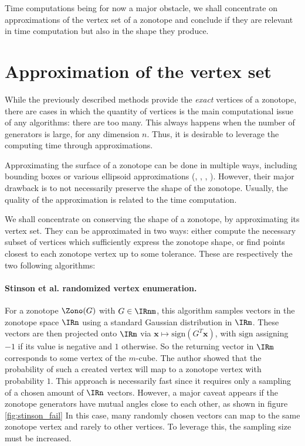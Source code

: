 Time computations being for now a major obstacle, we shall concentrate on approximations of the vertex set of a zonotope and conclude if they are relevant in time computation but also in the shape they produce.

\section{Approximation of the vertex set}
\label{sec:approximation_of_vertices_zonotope}
While the previously described methods provide the \emph{exact} vertices of a zonotope, there are cases in which the quantity of vertices is the main computational issue of any algorithms: there are too many.
This always happens when the number of generators is large, for any dimension $n$. Thus, it is desirable to leverage the computing time through approximations.

Approximating the surface of a zonotope can be done in multiple ways, including bounding boxes or various ellipsoid approximations (\cite{cernyGoffinAlgorithmZonotopes2012}, \cite{gasmannScalableZonotopeEllipsoidConversions2020}, \cite{kousikEllipsotopesCombiningEllipsoids2021}, \cite{henkLownerJohnEllipsoids2012}). However, their major drawback is to not necessarily preserve the shape of the zonotope. Usually, the quality of the approximation is related to the time computation.

We shall concentrate on conserving the shape of a zonotope, by approximating its vertex set. They can be approximated in two ways: either compute the necessary subset of vertices which sufficiently express the zonotope shape, or find points closest to each zonotope vertex up to some tolerance. These are respectively the two following algorithms:

\paragraph*{Stinson et al. randomized vertex enumeration\cite{stinsonRandomizedAlgorithmEnumerating2016}.}
For a zonotope $\Zono(G)$ with $G\in \IRnm$, this algorithm samples vectors in the zonotope space $\IRn$ using a standard Gaussian distribution in $\IRm$. These vectors are then projected onto $\IRm$ via $\mathbf{x}\mapsto \text{sign}(G^T\mathbf{x})$, with $\text{sign}$ assigning $-1$ if its value is negative and $1$ otherwise. So the returning vector in $\IRm$ corresponds to some vertex of the $m$-cube. The author showed that the probability of such a created vertex will map to a zonotope vertex with probability $1$. This approach is necessarily fast since it requires only a sampling of a chosen amount of $\IRn$ vectors. However, a major caveat appears if the zonotope generators have mutual angles close to each other, as shown in figure \ref{fig:stinson_fail} In this case, many randomly chosen vectors can map to the same zonotope vertex and rarely to other vertices. To leverage this, the sampling size must be increased.


